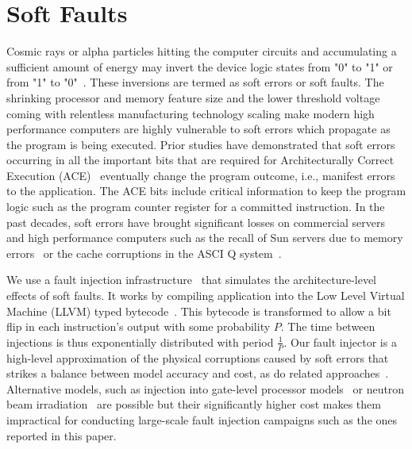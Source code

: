 \documentclass{sig-alternate}
\begin{document}
{\section{Soft Faults}
\label{sec:soft_faults}

Cosmic rays or alpha particles hitting the computer circuits and accumulating a sufficient amount of energy may invert the device logic states from "0" to "1" or from "1" to "0"~\cite{Ziegler:1996:TCR:226354.226356,baumann:2005}.
These inversions are termed as soft errors or soft faults.
The shrinking processor and memory feature size and the lower threshold voltage coming with relentless manufacturing technology scaling make modern high performance computers are highly vulnerable to soft errors which propagate as the program is being executed.
Prior studies have demonstrated that soft errors occurring in all the important bits that are required for Architecturally Correct Execution (ACE)~\cite{avf:2003} eventually change the program outcome, i.e., manifest errors to the application.
The ACE bits include critical information to keep the program logic such as the program counter register for a committed instruction.
In the past decades, soft errors have brought significant losses on commercial servers and high performance computers such as the recall of Sun servers due to memory errors~\cite{baumann:2005} or the cache corruptions in the ASCI Q system~\cite{asciQSER:2005}.


We use a fault injection infrastructure~\cite{relax:2010} that simulates the architecture-level effects of soft faults.
It works by compiling application into the Low Level Virtual Machine (LLVM) typed bytecode~\cite{LLVM}.
This bytecode is transformed to allow a bit flip in each instruction's output with some probability $P$.
The time between injections is thus exponentially distributed with period $\frac{1}{P}$.
Our fault injector is a high-level approximation of the physical corruptions caused by soft errors that strikes a balance between model accuracy and cost, as do related approaches~\cite{fault_injection:iyer:1997, avf:2003}.
Alternative models, such as injection into gate-level processor models~\cite{sesee:2004} or neutron beam irradiation~\cite{freq_dep:irom:2004} are possible but their significantly higher cost makes them impractical for conducting large-scale fault injection campaigns such as the ones reported in this paper.

}
\end{document}
